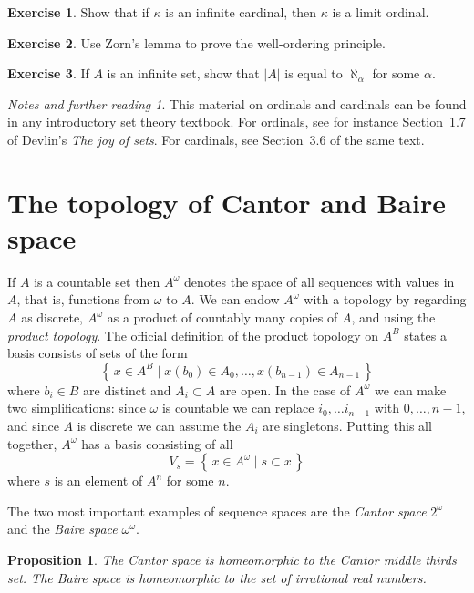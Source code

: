 \documentclass[11pt,oneside]{amsbook}
\newcommand{\set}[1]{\left\{\,#1\,\right\}}
\theoremstyle{definition}
\newtheorem{exerc}{Exercise}[section]
\theoremstyle{plain}
\newtheorem{proposition}[theorem]{Proposition}
\theoremstyle{definition}
\theoremstyle{remark}
\newtheorem*{notes}{Notes and further reading}
\numberwithin{equation}{section}
\numberwithin{figure}{section}
\begin{document}
\begin{exerc}
  Show that if $\kappa$ is an infinite cardinal, then $\kappa$ is a limit ordinal.
\end{exerc}

\begin{exerc}
  Use Zorn's lemma to prove the well-ordering principle.
\end{exerc}

\begin{exerc}
  If $A$ is an infinite set, show that $|A|$ is equal to $\aleph_\alpha$ for some $\alpha$.
\end{exerc}

\begin{notes}
  This material on ordinals and cardinals can be found in any introductory set theory textbook. For ordinals, see for instance Section~1.7 of Devlin's \emph{The joy of sets}. For cardinals, see Section~3.6 of the same text.
\end{notes}


\newpage
\section{The topology of Cantor and Baire space}

If $A$ is a countable set then $A^\omega$ denotes the space of all sequences with values in $A$, that is, functions from $\omega$ to $A$. We can endow $A^\omega$ with a topology by regarding $A$ as discrete, $A^\omega$ as a product of countably many copies of $A$, and using the \emph{product topology}. The official definition of the product topology on $A^B$ states a basis consists of sets of the form
\[\set{x\in A^B\mid x(b_0)\in A_0,\ldots,x(b_{n-1})\in A_{n-1}}
\]
where $b_i\in B$ are distinct and $A_i\subset A$ are open. In the case of $A^\omega$ we can make two simplifications: since $\omega$ is countable we can replace $i_0,\ldots i_{n-1}$ with $0,\ldots,n-1$, and since $A$ is discrete we can assume the $A_i$ are singletons. Putting this all together, $A^\omega$ has a basis consisting of all
\[V_s=\set{x\in A^\omega\mid s\subset x}
\]
where $s$ is an element of $A^n$ for some $n$.

The two most important examples of sequence spaces are the \emph{Cantor space} $2^\omega$ and the \emph{Baire space} $\omega^\omega$.

\begin{proposition}
  \label{prop:cantor-baire-homeo}
  The Cantor space is homeomorphic to the Cantor middle thirds set. The Baire space is homeomorphic to the set of irrational real numbers.
\end{proposition}
\end{document}
